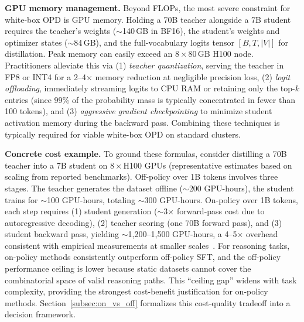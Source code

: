 \documentclass{article} %
\begin{document}
\textbf{GPU memory management.} Beyond FLOPs, the most severe constraint for white-box OPD is GPU memory. Holding a 70B teacher alongside a 7B student requires the teacher's weights ($\sim$140\,GB in BF16), the student's weights and optimizer states ($\sim$84\,GB), and the full-vocabulary logits tensor $[B, T, |V|]$ for distillation. Peak memory can easily exceed an $8\times80$\,GB H100 node. Practitioners alleviate this via (1) \textit{teacher quantization}, serving the teacher in FP8 or INT4 for a 2--4$\times$ memory reduction at negligible precision loss, (2) \textit{logit offloading}, immediately streaming logits to CPU RAM or retaining only the top-$k$ entries (since 99\% of the probability mass is typically concentrated in fewer than 100 tokens), and (3) \textit{aggressive gradient checkpointing} to minimize student activation memory during the backward pass. Combining these techniques is typically required for viable white-box OPD on standard clusters.

\textbf{Concrete cost example.} To ground these formulas, consider distilling a 70B teacher into a 7B student on $8\times$H100 GPUs (representative estimates based on scaling from reported benchmarks). Off-policy over 1B tokens involves three stages. The teacher generates the dataset offline ($\sim$200 GPU-hours), the student trains for $\sim$100 GPU-hours, totaling $\sim$300 GPU-hours. On-policy over 1B tokens, each step requires (1) student generation ($\sim$3$\times$ forward-pass cost due to autoregressive decoding), (2) teacher scoring (one 70B forward pass), and (3) student backward pass, yielding $\sim$1,200--1,500 GPU-hours, a 4--5$\times$ overhead consistent with empirical measurements at smaller scales~\citep{wu2026lightning}. For reasoning tasks, on-policy methods consistently outperform off-policy SFT, and the off-policy performance ceiling is lower because static datasets cannot cover the combinatorial space of valid reasoning paths. This ``ceiling gap'' widens with task complexity, providing the strongest cost-benefit justification for on-policy methods. Section~\ref{subsec:on_vs_off} formalizes this cost-quality tradeoff into a decision framework.
\end{document}
